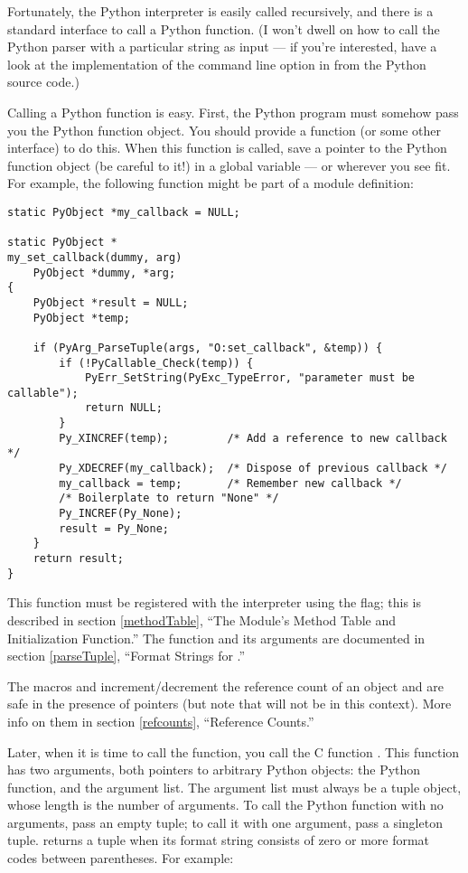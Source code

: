 \documentclass{manual}
\begin{document}
Fortunately, the Python interpreter is easily called recursively, and
there is a standard interface to call a Python function.  (I won't
dwell on how to call the Python parser with a particular string as
input --- if you're interested, have a look at the implementation of
the  command line option in  from
the Python source code.)

Calling a Python function is easy.  First, the Python program must
somehow pass you the Python function object.  You should provide a
function (or some other interface) to do this.  When this function is
called, save a pointer to the Python function object (be careful to
 it!) in a global variable --- or wherever you
see fit. For example, the following function might be part of a module
definition:

\begin{verbatim}
static PyObject *my_callback = NULL;

static PyObject *
my_set_callback(dummy, arg)
    PyObject *dummy, *arg;
{
    PyObject *result = NULL;
    PyObject *temp;

    if (PyArg_ParseTuple(args, "O:set_callback", &temp)) {
        if (!PyCallable_Check(temp)) {
            PyErr_SetString(PyExc_TypeError, "parameter must be callable");
            return NULL;
        }
        Py_XINCREF(temp);         /* Add a reference to new callback */
        Py_XDECREF(my_callback);  /* Dispose of previous callback */
        my_callback = temp;       /* Remember new callback */
        /* Boilerplate to return "None" */
        Py_INCREF(Py_None);
        result = Py_None;
    }
    return result;
}
\end{verbatim}

This function must be registered with the interpreter using the
 flag; this is described in section
\ref{methodTable}, ``The Module's Method Table and Initialization
Function.''  The  function and its
arguments are documented in section \ref{parseTuple}, ``Format Strings
for .''

The macros  and 
increment/decrement the reference count of an object and are safe in
the presence of \NULL{} pointers (but note that  will not be 
\NULL{} in this context).  More info on them in section
\ref{refcounts}, ``Reference Counts.''

Later, when it is time to call the function, you call the C function
.  This function has two arguments, both
pointers to arbitrary Python objects: the Python function, and the
argument list.  The argument list must always be a tuple object, whose
length is the number of arguments.  To call the Python function with
no arguments, pass an empty tuple; to call it with one argument, pass
a singleton tuple.   returns a tuple when its
format string consists of zero or more format codes between
parentheses.  For example:
\end{document}
